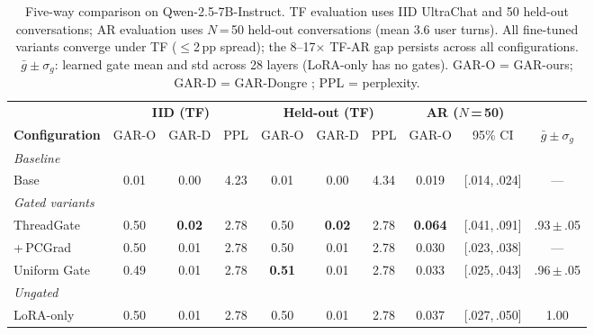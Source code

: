 \begin{table}[!t]
\centering
\small
\caption{Five-way comparison on Qwen-2.5-7B-Instruct. TF evaluation uses IID UltraChat and 50 held-out conversations; AR evaluation uses $N$\,=\,50 held-out conversations (mean 3.6 user turns). All fine-tuned variants converge under TF ($\leq$2\,pp spread); the 8--17$\times$ TF-AR gap persists across all configurations. $\bar{g}\!\pm\!\sigma_g$: learned gate mean and std across 28 layers (LoRA-only has no gates). GAR-O = GAR-ours; GAR-D = GAR-Dongre \citep{dongre2026attention}; PPL = perplexity.}
\label{tab:five-way}
\begin{tabular}{l ccc ccc cc c}
\toprule
& \multicolumn{3}{c}{\textbf{IID (TF)}} & \multicolumn{3}{c}{\textbf{Held-out (TF)}} & \multicolumn{2}{c}{\textbf{AR ($N$\,=\,50)}} & \\
\cmidrule(lr){2-4} \cmidrule(lr){5-7} \cmidrule(lr){8-9}
\textbf{Configuration} & GAR-O & GAR-D & PPL & GAR-O & GAR-D & PPL & GAR-O & 95\% CI & $\bar{g}\!\pm\!\sigma_g$ \\
\midrule
\multicolumn{10}{l}{\emph{Baseline}} \\
Base              & 0.01 & 0.00 & 4.23 & 0.01 & 0.00 & 4.34 & 0.019 & {\scriptsize[.014,\,.024]} & --- \\
\midrule
\multicolumn{10}{l}{\emph{Gated variants}} \\
ThreadGate        & 0.50 & \textbf{0.02} & 2.78 & 0.50 & \textbf{0.02} & 2.78 & \textbf{0.064} & {\scriptsize[.041,\,.091]} & .93\,{\scriptsize$\pm$\,.05} \\
\;+\,PCGrad       & 0.50 & 0.01 & 2.78 & 0.50 & 0.01 & 2.78 & 0.030 & {\scriptsize[.023,\,.038]} & --- \\
Uniform Gate      & 0.49 & 0.01 & 2.78 & \textbf{0.51} & 0.01 & 2.78 & 0.033 & {\scriptsize[.025,\,.043]} & .96\,{\scriptsize$\pm$\,.05} \\
\midrule
\multicolumn{10}{l}{\emph{Ungated}} \\
LoRA-only         & 0.50 & 0.01 & 2.78 & 0.50 & 0.01 & 2.78 & 0.037 & {\scriptsize[.027,\,.050]} & 1.00 \\
\bottomrule
\end{tabular}
\end{table}
